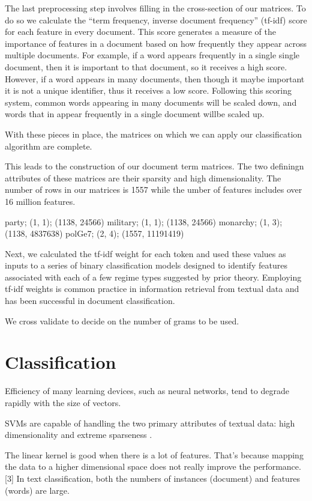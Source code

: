 \documentclass[pdftex,12pt,fullpage,oneside]{amsart}
\begin{document}
The last preprocessing step involves filling in the cross-section of our matrices. To do so we calculate the ``term frequency, inverse document frequency'' (tf-idf) score for each feature in every document. This score generates a measure of the importance of features in a document based on how frequently they appear across multiple documents. For example, if a word appears frequently in a single single document, then it is important to that document, so it receives a high score. However, if a word appears in many documents, then though it maybe important it is not a unique identifier, thus it receives a low score. Following this scoring system, common words appearing in many documents will be scaled down, and words that in appear frequently in a single document willbe scaled up.

With these pieces in place, the matrices on which we can apply our classification algorithm are complete. 

This leads to the construction of our document term matrices. The two definingn attributes of these matrices are their sparsity and high dimensionality. The number of rows in our matrices is 1557 while the umber of features includes over 16 million features.

party; (1, 1); (1138, 24566)
military; (1, 1); (1138, 24566)
monarchy; (1, 3); (1138, 4837638)
polGe7; (2, 4); (1557, 11191419)

Next, we calculated the tf-idf weight for each token and used these values as inputs to a series of binary classification models designed to identify features associated with each of a few regime types suggested by prior theory. Employing tf-idf weights is common practice in information retrieval from textual data and has been successful in document classification. 

We cross validate to decide on the number of grams to be used. 

\section{Classification}


Efficiency of many learning devices, such as neural networks, tend to degrade rapidly with the size of vectors.


SVMs are capable of handling the two primary attributes of textual data: high dimensionality and extreme sparseness \citep{dorazio:etal:2014}.

The linear kernel is good when there is a lot of features. That's because mapping the data to a higher dimensional space does not really improve the performance. [3]  In text classification, both the numbers of instances (document) and features (words) are large.
\end{document}
